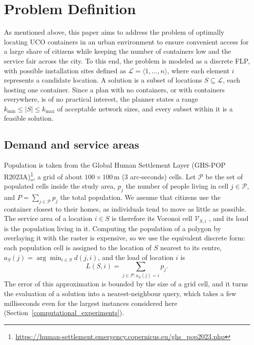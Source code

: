 \section{Problem Definition}
\label{problem_definition}
As mentioned above, this paper aims to address the problem of optimally locating UCO containers in an urban environment to ensure convenient access for a large share of citizens while keeping the number of containers low and the service fair across the city. To this end, the problem is modeled as a discrete FLP, with possible installation sites defined as $\mathcal{L} = \langle 1, \dots, n \rangle$, where each element $i$ represents a candidate location. A solution is a subset of locations $S \subseteq \mathcal{L}$, each hosting one container. Since a plan with no containers, or with containers everywhere, is of no practical interest, the planner states a range $k_{\min} \leq |S| \leq k_{\max}$ of acceptable network sizes, and every subset within it is a feasible solution.

\subsection{Demand and service areas}
Population is taken from the Global Human Settlement Layer (GHS-POP R2023A)\footnote{\url{https://human-settlement.emergency.copernicus.eu/ghs_pop2023.php}}, a grid of about $100 \times 100$\,m (3 arc-seconds) cells. Let $\mathcal{P}$ be the set of populated cells inside the study area, $p_j$ the number of people living in cell $j \in \mathcal{P}$, and $P = \sum_{j \in \mathcal{P}} p_j$ the total population. We assume that citizens use the container closest to their homes, as individuals tend to move as little as possible. The service area of a location $i \in S$ is therefore its Voronoi cell $\mathcal{V}_{S,i}$ \cite{erwig2000graph}, and its load is the population living in it. Computing the population of a polygon by overlaying it with the raster is expensive, so we use the equivalent discrete form: each population cell is assigned to the location of $S$ nearest to its centre, $a_S(j) = \arg\min_{i \in S} d(j,i)$, and the load of location $i$ is
\begin{equation}
    L(S,i) = \sum_{j \in \mathcal{P} : a_S(j) = i} p_j .
\end{equation}
The error of this approximation is bounded by the size of a grid cell, and it turns the evaluation of a solution into a nearest-neighbour query, which takes a few milliseconds even for the largest instances considered here (Section~\ref{computational_experiments}).

